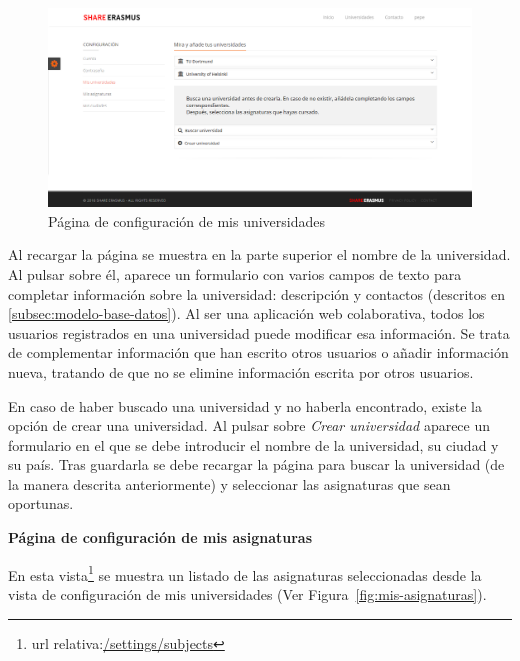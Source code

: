 \documentclass[a4paper, 12pt]{book}
\begin{document}
\begin{figure}[H]
  \centering
  \includegraphics[width=16cm, keepaspectratio]{img/mis-universidades.png}
  \caption{Página de configuración de mis universidades}
  \label{fig:mis-universidades}
\end{figure}

Al recargar la página se muestra en la parte superior el nombre de la universidad. Al pulsar sobre él, aparece un formulario con varios campos de texto para completar información sobre la universidad: descripción y contactos (descritos en \ref{subsec:modelo-base-datos}). Al ser una aplicación web colaborativa, todos los usuarios registrados en una universidad puede modificar esa información. Se trata de complementar información que han escrito otros usuarios o añadir información nueva, tratando de que no se elimine información escrita por otros usuarios.
\newline

En caso de haber buscado una universidad y no haberla encontrado, existe la opción de crear una universidad. Al pulsar sobre \textit{Crear universidad} aparece un formulario en el que se debe introducir el nombre de la universidad, su ciudad y su país. Tras guardarla se debe recargar la página para buscar la universidad (de la manera descrita anteriormente) y seleccionar las asignaturas que sean oportunas.
\newline


{\large  \textbf{Página de configuración de mis asignaturas}\par}

En esta vista\footnote{url relativa:\url{/settings/subjects}} se muestra un listado de las asignaturas seleccionadas desde la vista de configuración de mis universidades (Ver Figura~\ref{fig:mis-asignaturas}). 
\newline
\end{document}
